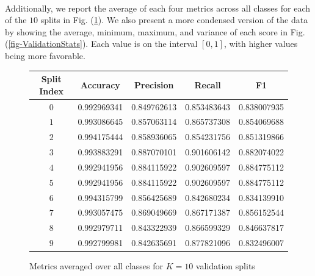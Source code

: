 \documentclass[12pt,letterpaper]{article}
\begin{document}
\paragraph*{}Additionally, we report the average of each four metrics across all classes for each of the $10$ splits in Fig. (\ref{fig-ValidationTable}). We also present a more condensed version of the data by showing the average, minimum, maximum, and variance of each score in Fig. (\ref{fig-ValidationStats}). Each value is on the interval $[0,1]$, with higher values being more favorable.
\begin{figure}[H]
\begin{center}
\begin{tabular}{|c|c|c|c|c|}
\hline
\textbf{Split Index} & \textbf{Accuracy} & \textbf{Precision} & \textbf{Recall} & \textbf{F1} \\ \hline
$0$ & 0.992969341 & 0.849762613	& 0.853483643 & 0.838007935 \\ \hline
$1$ & 0.993086645 & 0.857063114	& 0.865737308 & 0.854069688 \\ \hline
$2$ & 0.994175444 & 0.858936065	& 0.854231756 & 0.851319866 \\ \hline
$3$ & 0.993883291 & 0.887070101	& 0.901606142 & 0.882074022 \\ \hline
$4$ & 0.992941956 & 0.884115922	& 0.902609597 & 0.884775112 \\ \hline
$5$ & 0.992941956 & 0.884115922	& 0.902609597 & 0.884775112 \\ \hline
$6$ & 0.994315799 & 0.856425689	& 0.842680234 & 0.834139910 \\ \hline
$7$ & 0.993057475 & 0.869049669	& 0.867171387 & 0.856152544 \\ \hline
$8$ & 0.992979711 & 0.843322939	& 0.866599329 & 0.846637817 \\ \hline
$9$ & 0.992799981 & 0.842635691	& 0.877821096 & 0.832496007 \\ \hline
\end{tabular}
\end{center}
\caption{Metrics averaged over all classes for $K=10$ validation splits}
\label{fig-ValidationTable}
\end{figure}
\end{document}

